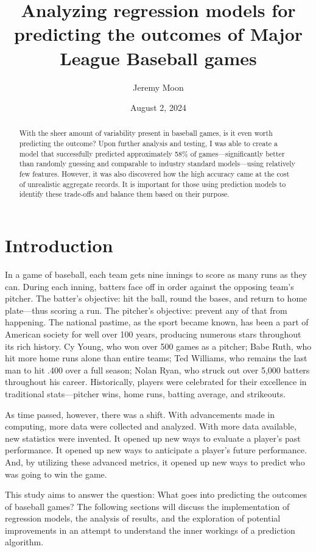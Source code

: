 \documentclass{paper}
\title{Analyzing regression models for predicting the outcomes of Major League Baseball games}
\author[1]{Jeremy Moon}
\affil[1]{Institute for Computing in Research}
\date{August 2, 2024}
\begin{document}
\maketitle

\begin{abstract}
With the sheer amount of variability present in baseball games, is it even worth predicting the outcome? Upon further analysis and testing, I was able to create a model that successfully predicted approximately 58\% of games---significantly better than randomly guessing and comparable to industry standard models---using relatively few features. However, it was also discovered how the high accuracy came at the cost of unrealistic aggregate records. It is important for those using prediction models to identify these trade-offs and balance them based on their purpose.
\end{abstract}

\section{Introduction}
In a game of baseball, each team gets nine innings to score as many runs as they can. During each inning, batters face off in order against the opposing team's pitcher. The batter's objective: hit the ball, round the bases, and return to home plate---thus scoring a run. The pitcher's objective: prevent any of that from happening. The national pastime, as the sport became known, has been a part of American society for well over 100 years, producing numerous stars throughout its rich history. Cy Young, who won over 500 games as a pitcher; Babe Ruth, who hit more home runs alone than entire teams; Ted Williams, who remains the last man to hit .400 over a full season; Nolan Ryan, who struck out over 5,000 batters throughout his career. Historically, players were celebrated for their excellence in traditional stats---pitcher wins, home runs, batting average, and strikeouts.

As time passed, however, there was a shift. With advancements made in computing, more data were collected and analyzed. With more data available, new statistics were invented. It opened up new ways to evaluate a player's past performance. It opened up new ways to anticipate a player's future performance. And, by utilizing these advanced metrics, it opened up new ways to predict who was going to win the game.

This study aims to answer the question: What goes into predicting the outcomes of baseball games? The following sections will discuss the implementation of regression models, the analysis of results, and the exploration of potential improvements in an attempt to understand the inner workings of a prediction algorithm.
\end{document}
